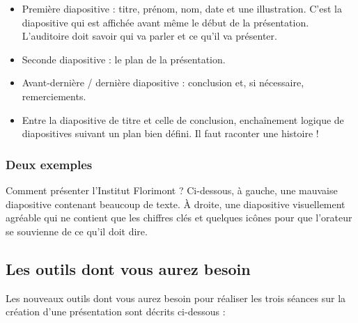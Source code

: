\begin{itemize}
\item Première diapositive : titre, prénom, nom, date et une illustration. C'est la diapositive qui est affichée avant même le début de la présentation. L'auditoire doit savoir qui va parler et ce qu'il va présenter.
\item Seconde diapositive : le plan de la présentation.
\item Avant-dernière / dernière diapositive : conclusion et, si nécessaire, remerciements.
\item Entre la diapositive de titre et celle de conclusion, enchaînement logique de diapositives suivant un plan bien défini. Il faut raconter une histoire !
\end{itemize}

\subsubsection{Deux exemples}

Comment présenter l'Institut Florimont ? Ci-dessous, à gauche, une mauvaise diapositive contenant beaucoup de texte. À droite, une diapositive visuellement agréable qui ne contient que les chiffres clés et quelques icônes pour que l'orateur se souvienne de ce qu'il doit dire.




\subsection{Les outils dont vous aurez besoin}\label{Presentation6eOutils}

Les nouveaux outils dont vous aurez besoin pour réaliser les trois séances sur la création d'une présentation sont décrits ci-dessous :


